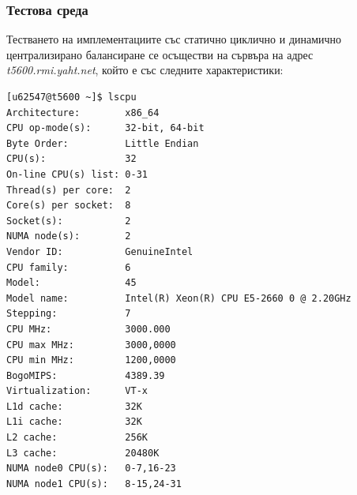\documentclass[a4paper,11pt]{article}
\begin{document}
\subsubsection{Тестова среда}
Тестването на имплементациите със статично циклично и динамично централизирано балансиране се осъществи на сървъра на адрес \emph{t5600.rmi.yaht.net}, който е със следните характеристики:
\begin{lstlisting}[]
[u62547@t5600 ~]$ lscpu
Architecture:        x86_64
CPU op-mode(s):      32-bit, 64-bit
Byte Order:          Little Endian
CPU(s):              32
On-line CPU(s) list: 0-31
Thread(s) per core:  2
Core(s) per socket:  8
Socket(s):           2
NUMA node(s):        2
Vendor ID:           GenuineIntel
CPU family:          6
Model:               45
Model name:          Intel(R) Xeon(R) CPU E5-2660 0 @ 2.20GHz
Stepping:            7
CPU MHz:             3000.000
CPU max MHz:         3000,0000
CPU min MHz:         1200,0000
BogoMIPS:            4389.39
Virtualization:      VT-x
L1d cache:           32K
L1i cache:           32K
L2 cache:            256K
L3 cache:            20480K
NUMA node0 CPU(s):   0-7,16-23
NUMA node1 CPU(s):   8-15,24-31
\end{lstlisting}
\end{document}
